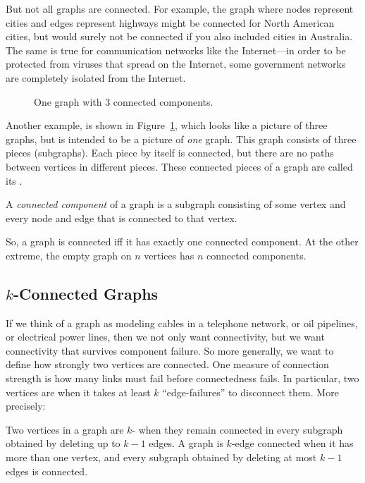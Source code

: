But not all graphs are connected.  For example, the graph where nodes
represent cities and edges represent highways might be connected for
North American cities, but would surely not be connected if you also
included cities in Australia.  The same is true for communication
networks like the Internet---in order to be protected from viruses
that spread on the Internet, some government networks are completely
isolated from the Internet.

\begin{figure}[htbp]


\caption{One graph with 3 connected components.}

\label{fig:3comp}
\end{figure}

Another example, is shown in Figure~\ref{fig:3comp}, which looks like a
picture of three graphs, but is intended to be a picture of \emph{one}
graph.  This graph consists of three pieces (subgraphs).  Each piece
by itself is connected, but there are no paths between vertices in
different pieces.  These connected pieces of a graph are called its
.

\begin{definition}\label{def:connected-component}
A \emph{connected component} of a graph is a subgraph consisting of
some vertex and every node and edge that is connected to that vertex.
\end{definition}

So, a graph is connected iff it has exactly one connected component.
At the other extreme, the empty graph on $n$ vertices has $n$
connected components.

\subsection{$k$-Connected Graphs}

If we think of a graph as modeling cables in a telephone network, or
oil pipelines, or electrical power lines, then we not only want
connectivity, but we want connectivity that survives component
failure.  So more generally, we want to define how strongly two
vertices are connected.  One measure of connection strength is how
many links must fail before connectedness fails.  In particular, two
vertices are  when it takes at least $k$
``edge-failures'' to disconnect them.  More precisely:

\begin{definition}\label{def:k-connected}
Two vertices in a graph are $k$- when they remain
connected in every subgraph obtained by deleting up to $k-1$ edges.  A
graph is $k$-edge
connected when it has
more than one vertex, and every subgraph obtained by deleting at most
$k-1$ edges is connected.
\end{definition}
\iffalse
every two of its vertices are $k$-edge connected.
\fi

